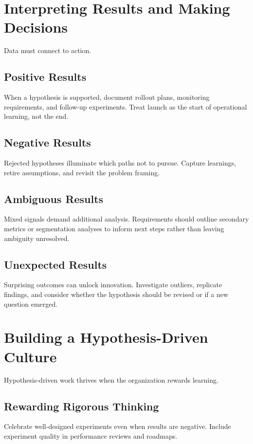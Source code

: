 \section{Interpreting Results and Making Decisions}
\label{sec:interpreting-results}

Data must connect to action.

\subsection{Positive Results}
When a hypothesis is supported, document rollout plans, monitoring requirements, and follow-up experiments. Treat launch as the start of operational learning, not the end.

\subsection{Negative Results}
Rejected hypotheses illuminate which paths not to pursue. Capture learnings, retire assumptions, and revisit the problem framing.

\subsection{Ambiguous Results}
Mixed signals demand additional analysis. Requirements should outline secondary metrics or segmentation analyses to inform next steps rather than leaving ambiguity unresolved.

\subsection{Unexpected Results}
Surprising outcomes can unlock innovation. Investigate outliers, replicate findings, and consider whether the hypothesis should be revised or if a new question emerged.

\section{Building a Hypothesis-Driven Culture}
\label{sec:hypothesis-culture}

Hypothesis-driven work thrives when the organization rewards learning.

\subsection{Rewarding Rigorous Thinking}
Celebrate well-designed experiments even when results are negative. Include experiment quality in performance reviews and roadmaps.

